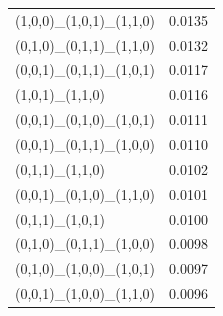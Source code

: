 \documentclass[11pt]{article}
\begin{document}
\begin{minipage}[t]{\linewidth}
\begin{tabular}{@{}lr@{}}
(1,0,0)\_(1,0,1)\_(1,1,0)                         & 0.0135 \\
(0,1,0)\_(0,1,1)\_(1,1,0)                         & 0.0132 \\
(0,0,1)\_(0,1,1)\_(1,0,1)                         & 0.0117 \\
(1,0,1)\_(1,1,0)                                   & 0.0116 \\
(0,0,1)\_(0,1,0)\_(1,0,1)                         & 0.0111 \\
(0,0,1)\_(0,1,1)\_(1,0,0)                         & 0.0110 \\
(0,1,1)\_(1,1,0)                                   & 0.0102 \\
(0,0,1)\_(0,1,0)\_(1,1,0)                         & 0.0101 \\
(0,1,1)\_(1,0,1)                                   & 0.0100 \\
(0,1,0)\_(0,1,1)\_(1,0,0)                         & 0.0098 \\
(0,1,0)\_(1,0,0)\_(1,0,1)                         & 0.0097 \\
(0,0,1)\_(1,0,0)\_(1,1,0)                         & 0.0096 \\
\bottomrule
\end{tabular}
\end{minipage}
\hfill
\end{document}
